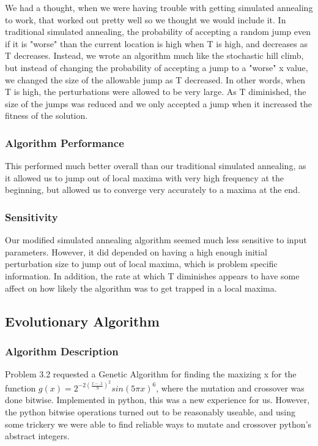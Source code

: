 We had a thought, when we were having trouble with getting simulated annealing to work, that worked out pretty well so we thought we would include it. In traditional simulated annealing, the probability of accepting a random jump even if it is "worse" than the current location is high when T is high, and decreases as T decreases. Instead, we wrote an algorithm much like the stochastic hill climb, but instead of changing the probability of accepting a jump to a "worse" x value, we changed the size of the allowable jump as T decreased. In other words, when T is high, the perturbations were allowed to be very large. As T diminished, the size of the jumps was reduced and we only accepted a jump when it increased the fitness of the solution. 

\subsubsection{Algorithm Performance}

This performed much better overall than our traditional simulated annealing, as it allowed us to jump out of local maxima with very high frequency at the beginning, but allowed us to converge very accurately to a maxima at the end.

\subsubsection{Sensitivity}

Our modified simulated annealing algorithm seemed much less sensitive to input parameters. However, it did depended on having a high enough initial perturbation size to jump out of local maxima, which is problem specific information. In addition, the rate at which T diminishes appears to have some affect on how likely the algorithm was to get trapped in a local maxima.

\subsection{Evolutionary Algorithm}

\subsubsection{Algorithm Description}

Problem 3.2 requested a Genetic Algorithm for finding the maxizing x for the function $g(x) = 2^{-2(\frac{x-.1}{.9})^2}sin(5\pi x)^6$, where the mutation and crossover was done bitwise.  Implemented in python, this was a new experience for us.  However, the python bitwise operations turned out to be reasonably useable, and using some trickery we were able to find reliable ways to mutate and crossover python's abstract integers.

